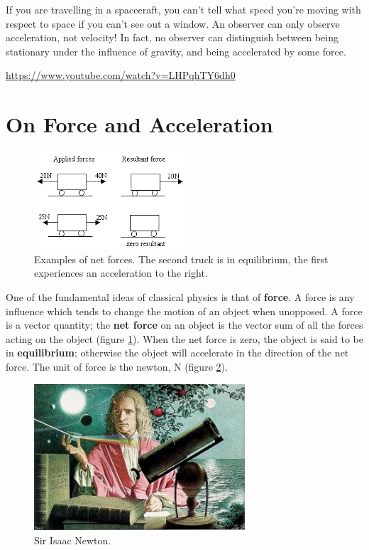 \documentclass[a4paper]{amsbook}
\newcommand\capcite[1]{}
\begin{document}
If you are travelling in a spacecraft, you can't tell what speed you're moving with respect to space if you can't see
out a window. An observer can only observe acceleration, not velocity! In fact, no observer can distinguish between
being stationary under the influence of gravity, and being accelerated by some force.

\begin{center}
\begin{tcolorbox}[width=0.8\textwidth,colback={red},title={\textbf{Go and watch...}},colbacktitle=yellow,coltitle=blue]
  \textcolor{white}{\url{https://www.youtube.com/watch?v=LHPqhTY6dh0}}
\end{tcolorbox}
\end{center}

\section{On Force and Acceleration}
\begin{figure}
  \centering
  \includegraphics[width=0.5\textwidth]{resultantforce}
  \caption{Examples of net forces. The second truck is in equilibrium, the first experiences an acceleration to the right. \capcite{https://cdn.miniphysics.com/wp-content/uploads/2014/11/forces-in-opposite-direction.jpg}\label{fig:resultant}}
\end{figure}
One of the fundamental ideas of classical physics is that of \textbf{force}. A force is any influence which tends to change the motion of an object
when unopposed. A force is a vector quantity; the \textbf{net force} on an object is the vector sum of all the forces acting on the
object (figure \ref{fig:resultant}).
When the net force is zero, the object is said to be in \textbf{equilibrium}; otherwise the object will accelerate in the direction of
the net force. The unit of force is the newton, N (figure \ref{fig:newton}).
\begin{figure}
  \centering
  \includegraphics[width=0.7\textwidth]{newton}
  \caption{Sir Isaac Newton. \capcite{http://teachertech.rice.edu/Participants/louviere/Newton/newton5.jpg}\label{fig:newton}}
\end{figure}
\end{document}
